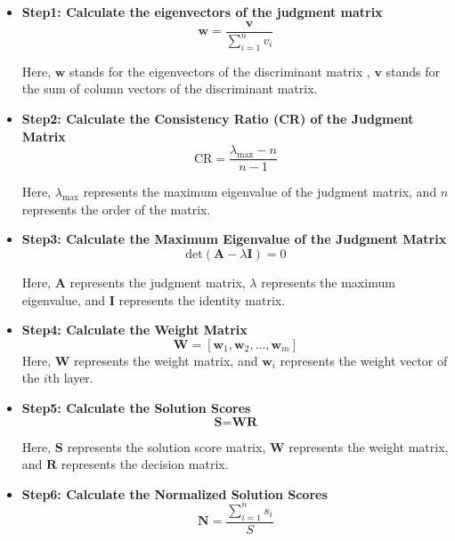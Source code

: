 \begin{itemize}
    \item \textbf{Step1: Calculate the eigenvectors of the judgment matrix}
        \begin{equation}
            \textbf{w} = \frac{\textbf{v}}{\sum_{i=1}^{n} v_i}
        \end{equation}
        
        Here, $\textbf{w}$ stands for the eigenvectors of the discriminant matrix , $\textbf{v}$ stands for the sum of column vectors of the discriminant matrix. 

\item \textbf{Step2: Calculate the Consistency Ratio (CR) of the Judgment Matrix}
\begin{equation}
\text{CR} = \frac{\lambda_{\text{max}}-n}{n-1}
\end{equation}

Here, $\lambda_{\text{max}}$ represents the maximum eigenvalue of the judgment matrix, and $n$ represents the order of the matrix.

\item\textbf{ Step3: Calculate the Maximum Eigenvalue of the Judgment Matrix}
    \begin{equation}
        \text{det}(\textbf{A}-\lambda\textbf{I}) = 0
    \end{equation}

Here, $\textbf{A}$ represents the judgment matrix, $\lambda$ represents the maximum eigenvalue, and $\textbf{I}$ represents the identity matrix.

\item \textbf{Step4: Calculate the Weight Matrix}
    \begin{equation}
        \textbf{W} = [\textbf{w}_1, \textbf{w}_2, ..., \textbf{w}_m]
    \end{equation}
Here, $\textbf{W}$ represents the weight matrix, and $\textbf{w}_i$ represents the weight vector of the $i$th layer.

\item\textbf{ Step5: Calculate the Solution Scores}
    \begin{equation}
        \textbf{S} = \textbf{W}\textbf{R}
    \end{equation}

Here, $\textbf{S}$ represents the solution score matrix, $\textbf{W}$ represents the weight matrix, and $\textbf{R}$ represents the decision matrix.

\item \textbf{Step6: Calculate the Normalized Solution Scores}
    \begin{equation}
        \textbf{N} = \frac{\sum_{i=1}^n s_i}{S}
    \end{equation}



\end{itemize}
